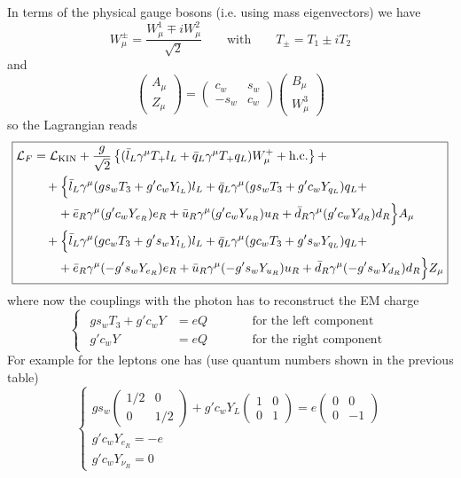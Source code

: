 \documentclass[TheoreticalPhy_ModB.tex]{subfiles}
\begin{document}
In terms of the physical gauge bosons (i.e. using mass eigenvectors) we have
\[W_\mu^\pm=\frac{W_\mu^1\mp iW_\mu^2}{\sqrt2}\qquad\text{with}\qquad T_\pm=T_1\pm iT_2\]
and
\[\begin{pmatrix}A_\mu\\ Z_\mu\end{pmatrix}=\begin{pmatrix}c_w&s_w\\-s_w&c_w\end{pmatrix}\begin{pmatrix}B_\mu\\W_\mu^3\end{pmatrix}\]
so the Lagrangian reads
\[\boxed{\begin{aligned}
\mathcal L_F
&=\mathcal L_{\text{KIN}}+\frac g{\sqrt2}\left\{(\bar l_L\gamma^\mu T_+l_L+\bar q_L\gamma^\mu T_+q_L)W_\mu^++\text{h.c.}\right\}+\\
&\quad+\Big\{\bar l_L\gamma^\mu(gs_wT_3+g'c_wY_{l_L})l_L+\bar q_L\gamma^\mu(gs_wT_3+g'c_wY_{q_L})q_L+\\
&\quad\quad+\bar e_R\gamma^\mu(g'c_wY_{e_R})e_R+\bar u_R\gamma^\mu(g'c_wY_{u_R})u_R+\bar d_R\gamma^\mu(g'c_wY_{d_R})d_R\Big\}A_\mu\\
&\quad+\Big\{\bar l_L\gamma^\mu(gc_wT_3+g's_wY_{l_L})l_L+\bar q_L\gamma^\mu(gc_wT_3+g's_wY_{q_L})q_L+\\
&\quad\quad+\bar e_R\gamma^\mu(-g's_wY_{e_R})e_R+\bar u_R\gamma^\mu(-g's_wY_{u_R})u_R+\bar d_R\gamma^\mu(-g's_wY_{d_R})d_R\Big\}Z_\mu
\end{aligned}}\]
where now the couplings with the photon has to reconstruct the EM charge
\[\begin{cases}\begin{aligned}
gs_wT_3+g'c_wY&=eQ&&\qquad\text{for the left component}\\
g'c_wY&=eQ&&\qquad\text{for the right component}
\end{aligned}\end{cases}\]
For example for the leptons one has (use quantum numbers shown in the previous table)
\[\begin{cases}
gs_w\begin{pmatrix}1/2&0\\0&1/2\end{pmatrix}+g'c_wY_L\begin{pmatrix}1&0\\0&1\end{pmatrix}=e\begin{pmatrix}0&0\\0&-1\end{pmatrix}\\
g'c_wY_{e_R}=-e\\
g'c_wY_{\nu_R}=0
\end{cases}\]
\end{document}
